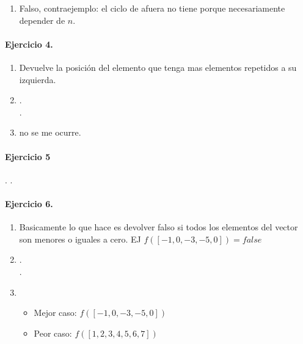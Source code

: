 \documentclass{article}
\begin{document}
\begin{enumerate}[label=\alph*)]
\item Falso, contraejemplo: el ciclo de afuera no tiene porque necesariamente depender de $n$.
\end{enumerate}
\paragraph{Ejercicio 4.}
\begin{enumerate}[label=\alph*)]
\item Devuelve la posición del elemento que tenga mas elementos repetidos a su izquierda.
\item .\\ .
\item no se me ocurre.
\end{enumerate}
\paragraph{Ejercicio 5}.
.
\paragraph{Ejercicio 6.}
\begin{enumerate}[label=\alph*)]
\item Basicamente lo que hace es devolver falso si todos los elementos del vector
	son menores o iguales a cero. EJ $f([-1,0,-3,-5,0])=false$
\item .\\ .
\item \begin{itemize}
			\item Mejor caso: $f([-1,0,-3,-5,0])$
			\item Peor caso: $f([1,2,3,4,5,6,7])$
		\end{itemize}	
\end{enumerate}
\end{document}
